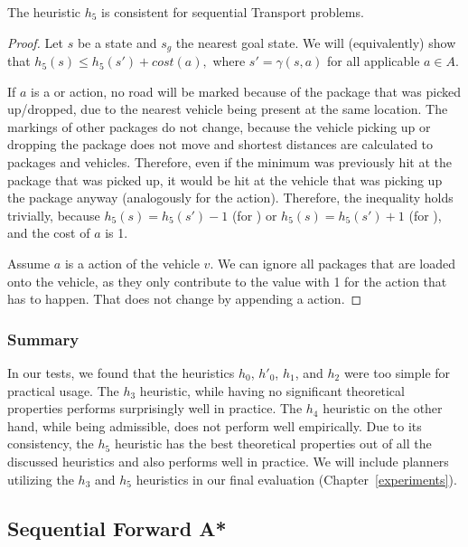 \begin{thm}
The heuristic $h_5$ is consistent for sequential Transport problems.
\end{thm}
\begin{proof}
Let $s$ be a state and $s_g$ the nearest goal state.
We will (equivalently) show that $h_5(s) \leq h_5(s') + cost(a),$ where
$s' = \gamma(s, a)$ for all applicable $a \in A$.

If $a$ is a \pickup{} or \drop{} action,
no road will be marked because of the package that was picked up/dropped,
due to the nearest vehicle being present at the same location.
The markings of other packages do not change, because
the vehicle picking up or dropping the package does not move
and shortest distances are calculated to packages and vehicles.
Therefore, even if the minimum was previously hit at the package that was
picked up, it would be hit at the vehicle that was picking up
the package anyway (analogously for the \drop{} action).
Therefore, the inequality holds trivially, because $h_5(s) = h_5(s') - 1$ (for \drop{})
or $h_5(s) = h_5(s') + 1$ (for \pickup{}), and the cost of $a$ is 1.

Assume $a$ is a \drive{} action of the vehicle $v$.
We can ignore all packages that are loaded onto the vehicle,
as they only contribute to the value with 1 for the \drop{} action
that has to happen. That does not change by appending a \drive{} action.
\end{proof}


\subsubsection{Summary}

In our tests, we found that
the heuristics $h_0$, $h'_0$, $h_1$, and $h_2$
were too simple for practical usage.
The $h_3$ heuristic, while having no significant
theoretical properties performs surprisingly well in practice.
The $h_4$ heuristic on the other hand, while being admissible, does not
perform well empirically.
Due to its consistency, the $h_5$ heuristic has the best theoretical properties out of all the discussed heuristics and also
performs well in practice.
We will include planners utilizing the $h_3$ and $h_5$ heuristics
in our final evaluation (Chapter~\ref{experiments}).








\subsection{Sequential Forward A*}\label{sfa}

